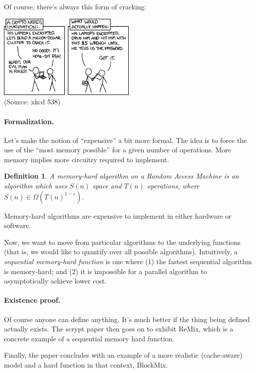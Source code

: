\documentclass[a4paper]{report}
\begin{document}
Of course, there's always this form of cracking:
\begin{center}
\includegraphics[width=0.5\textwidth]{images/xkcd-538}\\
\hfill (Source: xkcd 538)
\end{center}

\newtheorem{defn}{Definition}

\paragraph{Formalization.} Let's make the notion of ``expensive'' a bit more formal.
The idea is to force the use of the ``most memory possible'' for a given number of
operations. More memory implies more circuitry required to implement.

    \begin{defn}
      A \emph{memory-hard} algorithm on a Random Access Machine is an
      algorithm which uses $S(n)$ space and $T(n)$ operations, where
      $S(n) \in \Omega(T(n)^{1-\varepsilon})$.
    \end{defn}

Memory-hard algorithms are expensive to implement in either hardware or software.

Now, we want to move from particular algorithms to the underlying
functions (that is, we would like to quantify over all possible
algorithms). Intuitively, a \emph{sequential memory-hard function} is
one where (1) the fastest sequential algorithm is memory-hard; and (2)
it is impossible for a parallel algorithm to asymptotically achieve
lower cost.

\paragraph{Existence proof.} Of course anyone can define anything.
It's much better if the thing being defined actually exists. The
scrypt paper then goes on to exhibit ReMix, which is a concrete
example of a sequential memory hard function.

Finally, the paper concludes with an example of a more realistic
(cache-aware) model and a hard function in that context, BlockMix.
\end{document}
